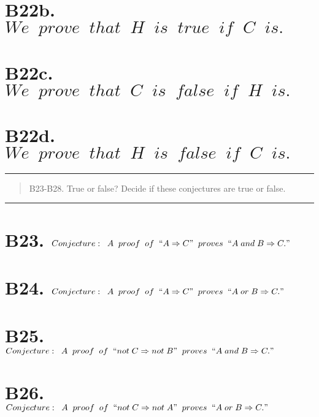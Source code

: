\section*{B22b. $We \;\; prove \;\; that \;\; H \;\; is \;\; true \;\; if \;\; C \;\; is.$}

\section*{B22c. $We \;\; prove \;\; that \;\; C \;\; is \;\; false \;\; if \;\; H \;\; is.$}

\section*{B22d. $We \;\; prove \;\; that \;\; H \;\; is \;\; false \;\; if \;\; C \;\; is.$}

\bgroup
\color{abs}
\hrule
\egroup

\begin{abstract}
	B23-B28. True or false? Decide if these conjectures are true or false.
	
	\noindent\textbf{}
	
\end{abstract}

\bgroup
\color{abs}
\hrule
\egroup

\section*{B23. $Conjecture: \;\; A \;\; proof \;\; of \;\; ``A \Rightarrow C" \;\; proves \;\; ``A \; and \; B \Rightarrow C."$}

\section*{B24. $Conjecture: \;\; A \;\; proof \;\; of \;\; ``A \Rightarrow C" \;\; proves \;\; ``A \; or \; B \Rightarrow C."$}

\section*{B25. $Conjecture: \;\; A \;\; proof \;\; of \;\; ``not \; C \Rightarrow not \; B" \;\; proves \;\; ``A \; and \; B \Rightarrow C."$}

\section*{B26. $Conjecture: \;\; A \;\; proof \;\; of \;\; ``not \; C \Rightarrow not \; A" \;\; proves \;\; ``A \; or \; B \Rightarrow C."$}

